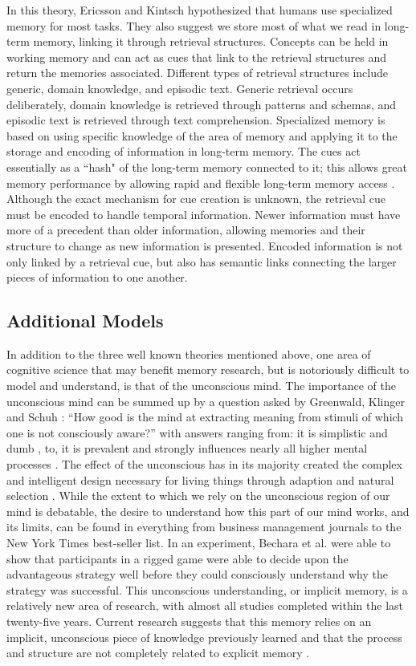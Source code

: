 In this theory, Ericsson and Kintsch \cite{LTM} hypothesized that
humans use specialized memory for most tasks.  They also suggest we store most
of what we read in long-term memory, linking it through retrieval structures.
Concepts can be held in working memory and can act as cues that link to the
retrieval structures and return the memories associated.  Different types of
retrieval structures include generic, domain knowledge, and episodic text.
Generic retrieval occurs deliberately, domain knowledge is retrieved through
patterns and schemas, and episodic text is retrieved through text comprehension.
Specialized memory is based on using specific knowledge of the area of memory
and applying it to the storage and encoding of information in long-term memory.
The cues act essentially as a ``hash" of the long-term memory connected to it;
this allows great memory performance by allowing rapid and flexible long-term
memory access \cite{LTM}.  Although the exact mechanism for cue creation is
unknown, the retrieval cue must be encoded to handle temporal information.
Newer information must have more of a precedent than older information, allowing
memories and their structure to change as new information is presented.  Encoded
information is not only linked by a retrieval cue, but also has semantic links
connecting the larger pieces of information to one another.

\subsection{Additional Models} 

In addition to the three well known theories
mentioned above, one area of cognitive science that may benefit memory research,
but is notoriously difficult to model and understand, is that of the unconscious
mind. The importance of the unconscious mind can be summed up by a question
asked by Greenwald, Klinger and Schuh \cite{SUBQUESTION}: ``How good is the mind
at extracting meaning from stimuli of which one is not consciously aware?'' with
answers ranging from: it is simplistic and dumb \cite{DUMBUNCONSCIOUS}, to, it
is prevalent and strongly influences nearly all higher mental processes
\cite{SMARTUNCONSCIOUS}. The effect of the unconscious has in its majority
created the complex and intelligent design necessary for living things through
adaption and natural selection \cite{UnconsciousMind}.  While the extent to
which we rely on the unconscious region of our mind is debatable, the desire to
understand how this part of our mind works, and its limits, can be found in
everything from business management journals to the New York Times best-seller
list. In an experiment, Bechara et al.\cite{Bechara2} were able to show that
participants in a rigged game were able to decide upon the advantageous strategy
well before they could consciously understand why the strategy was successful.
This unconscious understanding, or implicit memory, is a relatively new area of
research, with almost all studies completed within the last twenty-five years.
Current research suggests that this memory relies on an implicit, unconscious
piece of knowledge previously learned and that the process and structure are not
completely related to explicit memory \cite{ImplicitMem}. 


